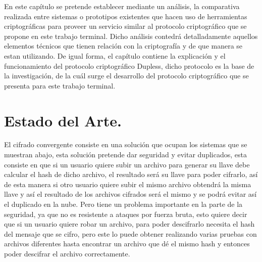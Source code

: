 
En este capítulo se pretende establecer mediante un análisis, la comparativa realizada entre sistemas o prototipos existentes que hacen uso de herramientas criptográficas para proveer un servicio similar al protocolo criptográfico que se propone en este trabajo terminal. Dicho análisis contedrá detalladamente aquellos elementos técnicos que tienen relación con la criptografía y de que manera se estan utilizando. De igual forma, el capítulo contiene la explicación y el funcionamiento del protocolo criptográfico Dupless, dicho protocolo es la base de la investigación, de la cuál surge el desarrollo del protocolo criptográfico que se presenta para este trabajo terminal. 






\section{Estado del Arte. }

El cifrado convergente consiste en una solución que ocupan los sistemas que se muestran abajo, esta solución pretende dar seguridad y evitar duplicados, esta consiste en que si un usuario quiere subir un archivo para generar su llave debe calcular el hash de dicho archivo, el resultado será su llave para poder cifrarlo, así de esta manera si otro usuario quiere subir el mismo archivo obtendrá la misma llave y así el resultado de los archivos cifrados será el mismo y se podrá evitar así el duplicado en la nube. Pero tiene un problema importante en la parte de la seguridad, ya que no es resistente a ataques por fuerza bruta, esto quiere decir que si un usuario quiere robar un archivo, para poder descifrarlo necesita el hash del mensaje que se cifro, pero este lo puede obtener realizando varias pruebas con archivos diferentes hasta encontrar un archivo que dé el mismo hash y entonces poder descifrar el archivo correctamente.
\\


